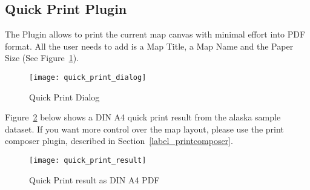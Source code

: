 
\subsection{Quick Print Plugin}


The  Plugin allows to print the current 
map canvas with minimal effort into PDF format. All the user needs to add 
is a Map Title, a Map Name and the Paper Size (See Figure~\ref{fig:quickprint}). 
\begin{figure}[ht]
   \begin{center}
   \caption{Quick Print Dialog \nixcaption}\label{fig:quickprint}\smallskip
   \texttt{[image: quick\_print\_dialog]}
\end{center}
\end{figure}

Figure~\ref{fig:quickprint_result} below shows a DIN A4 quick print result 
from the alaska sample dataset. If you want more control over the map layout, 
please use the print composer plugin, described in 
Section~\ref{label_printcomposer}.  

\begin{figure}[ht]
   \begin{center}
   \caption{Quick Print result as DIN A4 PDF\nixcaption}\label{fig:quickprint_result}\smallskip
   \texttt{[image: quick\_print\_result]}
\end{center}
\end{figure}


